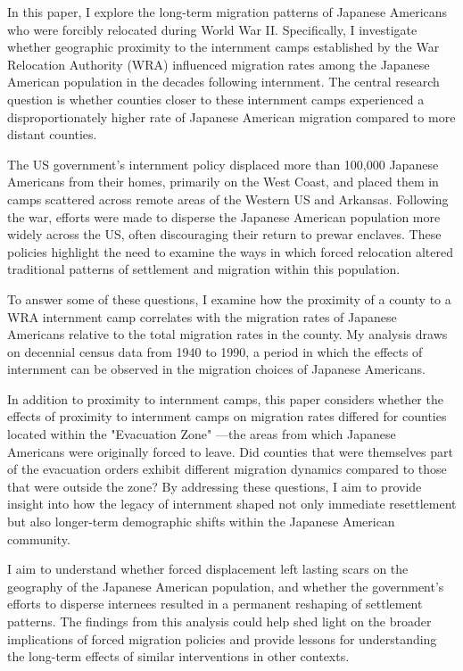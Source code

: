 In this paper, I explore the long-term migration patterns of Japanese Americans
who were forcibly relocated during World War II.
Specifically, I investigate whether geographic proximity to the internment camps
established by the War Relocation Authority (WRA)
influenced migration rates among the Japanese American population
in the decades following internment.
The central research question is
whether counties closer to these internment camps experienced a disproportionately higher rate of Japanese American migration compared to more distant counties.

The US government's internment policy displaced more than 100,000 Japanese Americans from their homes, 
primarily on the West Coast,
and placed them in camps scattered across remote areas of the Western US and Arkansas.
Following the war, 
efforts were made to disperse the Japanese American population more widely across the US,
often discouraging their return to prewar enclaves.
These policies highlight the need to examine the ways in which
forced relocation altered traditional patterns of settlement
and migration within this population.

To answer some of these questions, 
I examine how the proximity of a county to a WRA internment camp correlates with the migration rates of Japanese Americans 
relative to the total migration rates in the county.
My analysis draws on decennial census data from 1940 to 1990,
a period in which the effects of internment
can be observed in the migration choices of Japanese Americans.

In addition to proximity to internment camps,
this paper considers whether the effects of proximity to internment camps on migration rates 
differed for counties located within the "Evacuation Zone"
—the areas from which Japanese Americans were originally forced to leave.
Did counties that were themselves part of the evacuation orders 
exhibit different migration dynamics compared to those that were outside the zone?
By addressing these questions, I aim to provide insight into how the legacy of internment shaped not only immediate resettlement 
but also longer-term demographic shifts within the Japanese American community.

I aim to understand whether forced displacement left lasting scars on the geography of the Japanese American population,
and whether the government’s efforts to disperse internees resulted in a permanent reshaping of settlement patterns.
The findings from this analysis could help shed light on the broader implications of forced migration policies 
and provide lessons for understanding the long-term effects of similar interventions in other contexts.


